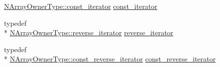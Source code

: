 \begin{DoxyCompactItemize}
\hyperlink{classvct_dynamic_n_array_ref_owner_ab6652472746656a9be2de178295fd80b}{N\-Array\-Owner\-Type\-::const\-\_\-iterator} \hyperlink{classvct_dynamic_const_n_array_ref_a9787d4311b3672d3f5ef00f485441a39}{const\-\_\-iterator}
\item 
typedef \\*
\hyperlink{classvct_dynamic_n_array_ref_owner_aabd87b1efc3a18043c6dac3d8017be59}{N\-Array\-Owner\-Type\-::reverse\-\_\-iterator} \hyperlink{classvct_dynamic_const_n_array_ref_a5d4c22b61341f1d69f6bc0f7b176761b}{reverse\-\_\-iterator}
\item 
typedef \\*
\hyperlink{classvct_dynamic_n_array_ref_owner_ade444e0883b2420a8a113171b6e49bf4}{N\-Array\-Owner\-Type\-::const\-\_\-reverse\-\_\-iterator} \hyperlink{classvct_dynamic_const_n_array_ref_ac774d4a8e4c0f0a5caeab26c96531d96}{const\-\_\-reverse\-\_\-iterator}
\end{DoxyCompactItemize}
